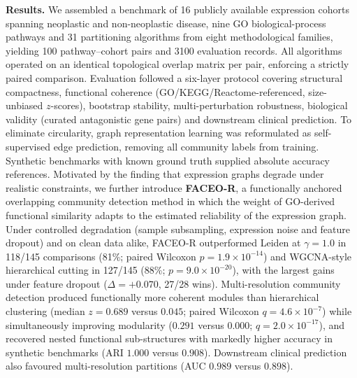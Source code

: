 \documentclass[twocolumn,10pt,letterpaper]{article}
\begin{document}
{\begin{minipage}{1.0\textwidth}
\vspace{4pt}
\noindent\textbf{Results.} We assembled a benchmark of 16 publicly available expression
cohorts spanning neoplastic and non-neoplastic disease, nine GO biological-process
pathways and 31 partitioning algorithms from eight methodological families, yielding 100
pathway--cohort pairs and 3100 evaluation records. All algorithms operated on an identical
topological overlap matrix per pair, enforcing a strictly paired comparison. Evaluation
followed a six-layer protocol covering structural compactness, functional coherence
(GO/KEGG/Reactome-referenced, size-unbiased $z$-scores), bootstrap stability,
multi-perturbation robustness, biological validity (curated antagonistic gene pairs) and
downstream clinical prediction. To eliminate circularity, graph representation learning was
reformulated as self-supervised edge prediction, removing all community labels from
training. Synthetic benchmarks with known ground truth supplied absolute accuracy
references. Motivated by the finding that expression graphs degrade under realistic
constraints, we further introduce \textbf{FACEO-R}, a functionally anchored overlapping
community detection method in which the weight of GO-derived functional similarity adapts
to the estimated reliability of the expression graph. Under controlled degradation (sample
subsampling, expression noise and feature dropout) and on clean data alike, FACEO-R
outperformed Leiden at $\gamma = 1.0$ in 118/145 comparisons (81\%;
paired Wilcoxon $p = 1.9\times10^{-14}$) and WGCNA-style
hierarchical cutting in 127/145 (88\%; $p = 9.0\times10^{-20}$), with
the largest gains under feature dropout ($\Delta = +0.070$, 27/28 wins). Multi-resolution community detection produced functionally more coherent
modules than hierarchical clustering (median $z = 0.689$ versus $0.045$; paired Wilcoxon
$q = 4.6\times10^{-7}$) while simultaneously improving modularity
($0.291$ versus $0.000$; $q = 2.0\times10^{-17}$), and recovered nested functional
sub-structures with markedly higher accuracy in synthetic benchmarks (ARI $1.000$ versus
$0.908$). Downstream clinical prediction also favoured multi-resolution partitions
(AUC $0.989$ versus $0.898$).


\end{minipage}}
\end{document}
